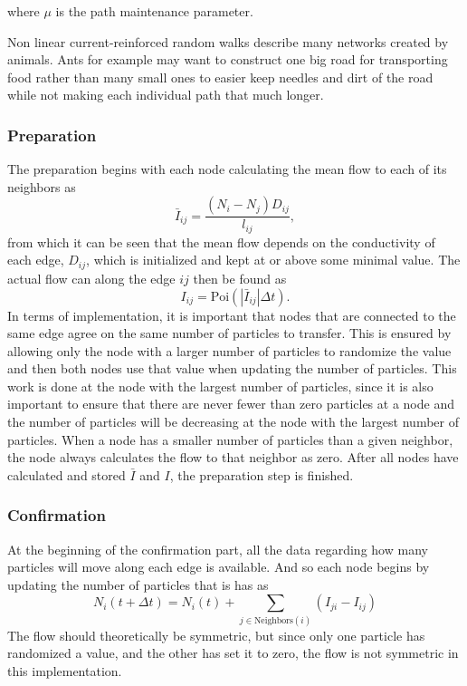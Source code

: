 \noindent where $\mu$ is the path maintenance parameter. 

Non linear current-reinforced random walks describe many networks created by animals. Ants for example may want to construct one big road for transporting food rather than many small ones to easier keep needles and dirt of the road while not making each individual path that much longer.


\subsubsection{Preparation}
The preparation begins with each node calculating the mean flow to each of its neighbors as
\begin{equation}
\bar{I}_{ij} = \frac{(N_i - N_j)D_{ij}}{l_{ij}},
\end{equation}
from which it can be seen that the mean flow depends on the conductivity of each edge, $D_{ij}$, which is initialized and kept at or above some minimal value.
The actual flow can along the edge $ij$ then be found as
\begin{equation}
I_{ij} = \text{Poi}(|\bar{I}_{ij}|\Delta t).
\end{equation}
In terms of implementation, it is important that nodes that are connected to the same edge agree on the same number of particles to transfer. This is ensured by allowing only the node with a larger number of particles to randomize the value and then both nodes use that value when updating the number of particles. This work is done at the node with the largest number of particles, since it is also important to ensure that there are never fewer than zero particles at a node and the number of particles will be decreasing at the node with the largest number of particles. When a node has a smaller number of particles than a given neighbor, the node always calculates the flow to that neighbor as zero. After all nodes have calculated and stored $\bar{I}$ and $I$, the preparation step is finished.

\subsubsection{Confirmation}
At the beginning of the confirmation part, all the data regarding how many particles will move along each edge is available. And so each node begins by updating the number of particles that is has as
 \begin{equation}
 N_i(t + \Delta t) = N_i(t) + \sum_{j \in \text{Neighbors}(i)} \left( I_{ji} - I_{ij} \right)
 \end{equation}
 The flow should theoretically be symmetric, but since only one particle has randomized a value, and the other has set it to zero, the flow is not symmetric in this implementation.
 
